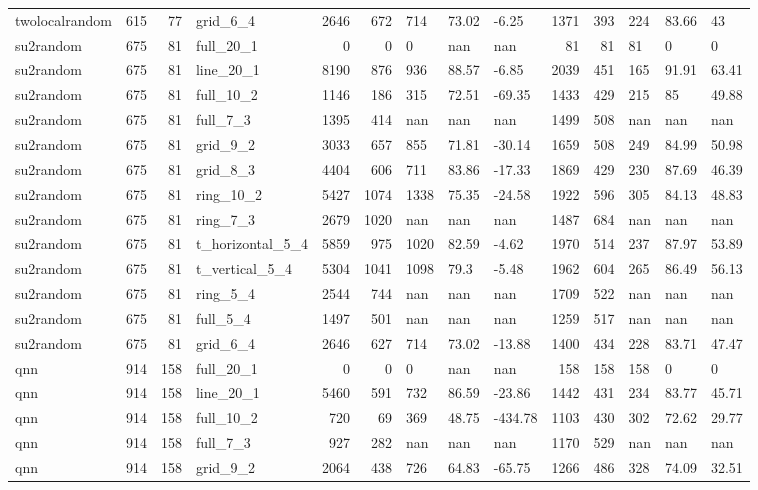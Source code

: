 \begin{longtable}{lrrlrrlllrrlll}
twolocalrandom & 615 & 77 & grid\_6\_4 & 2646 & 672 & 714 & 73.02 & -6.25 & 1371 & 393 & 224 & 83.66 & 43 \\
su2random & 675 & 81 & full\_20\_1 & 0 & 0 & 0 & nan & nan & 81 & 81 & 81 & 0 & 0 \\
su2random & 675 & 81 & line\_20\_1 & 8190 & 876 & 936 & 88.57 & -6.85 & 2039 & 451 & 165 & 91.91 & 63.41 \\
su2random & 675 & 81 & full\_10\_2 & 1146 & 186 & 315 & 72.51 & -69.35 & 1433 & 429 & 215 & 85 & 49.88 \\
su2random & 675 & 81 & full\_7\_3 & 1395 & 414 & nan & nan & nan & 1499 & 508 & nan & nan & nan \\
su2random & 675 & 81 & grid\_9\_2 & 3033 & 657 & 855 & 71.81 & -30.14 & 1659 & 508 & 249 & 84.99 & 50.98 \\
su2random & 675 & 81 & grid\_8\_3 & 4404 & 606 & 711 & 83.86 & -17.33 & 1869 & 429 & 230 & 87.69 & 46.39 \\
su2random & 675 & 81 & ring\_10\_2 & 5427 & 1074 & 1338 & 75.35 & -24.58 & 1922 & 596 & 305 & 84.13 & 48.83 \\
su2random & 675 & 81 & ring\_7\_3 & 2679 & 1020 & nan & nan & nan & 1487 & 684 & nan & nan & nan \\
su2random & 675 & 81 & t\_horizontal\_5\_4 & 5859 & 975 & 1020 & 82.59 & -4.62 & 1970 & 514 & 237 & 87.97 & 53.89 \\
su2random & 675 & 81 & t\_vertical\_5\_4 & 5304 & 1041 & 1098 & 79.3 & -5.48 & 1962 & 604 & 265 & 86.49 & 56.13 \\
su2random & 675 & 81 & ring\_5\_4 & 2544 & 744 & nan & nan & nan & 1709 & 522 & nan & nan & nan \\
su2random & 675 & 81 & full\_5\_4 & 1497 & 501 & nan & nan & nan & 1259 & 517 & nan & nan & nan \\
su2random & 675 & 81 & grid\_6\_4 & 2646 & 627 & 714 & 73.02 & -13.88 & 1400 & 434 & 228 & 83.71 & 47.47 \\
qnn & 914 & 158 & full\_20\_1 & 0 & 0 & 0 & nan & nan & 158 & 158 & 158 & 0 & 0 \\
qnn & 914 & 158 & line\_20\_1 & 5460 & 591 & 732 & 86.59 & -23.86 & 1442 & 431 & 234 & 83.77 & 45.71 \\
qnn & 914 & 158 & full\_10\_2 & 720 & 69 & 369 & 48.75 & -434.78 & 1103 & 430 & 302 & 72.62 & 29.77 \\
qnn & 914 & 158 & full\_7\_3 & 927 & 282 & nan & nan & nan & 1170 & 529 & nan & nan & nan \\
qnn & 914 & 158 & grid\_9\_2 & 2064 & 438 & 726 & 64.83 & -65.75 & 1266 & 486 & 328 & 74.09 & 32.51 \\

\end{longtable}
